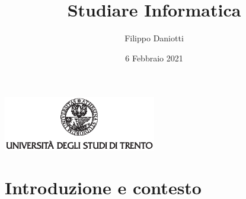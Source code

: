 \documentclass[aspectratio=1610]{beamer}
\title{Studiare Informatica}
\author{Filippo Daniotti}
\date{6 Febbraio 2021}
\institute[DISI]{Dipartimento di Ingegneria e Scienza dell'Informazione}
\begin{document}
	\begin{frame}[plain]
		\addtocounter{framenumber}{-1}
		\centering
		\includegraphics[width=0.5\textwidth, keepaspectratio]{logo-unitn.eps}		
		\titlepage
	\end{frame}


	\section{Introduzione e contesto}
\end{document}
